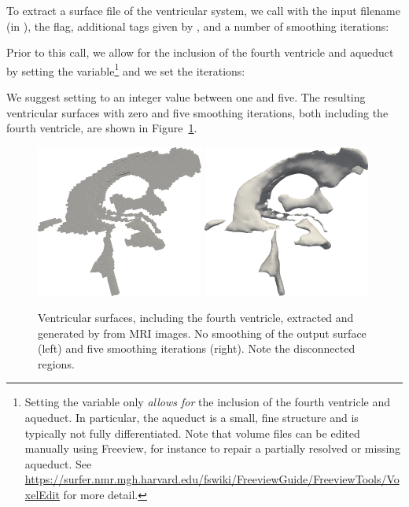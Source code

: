 \noindent To extract a surface file of the ventricular system, we call
 with the input filename (in ), the  flag, additional tags given by , and a number of smoothing iterations:


\noindent Prior to this call, we allow for the inclusion of the fourth
ventricle and aqueduct by setting the  variable\footnote{Setting 
the  variable only \textit{allows for} the inclusion of the fourth 
ventricle and aqueduct. In particular, the aqueduct is a small, fine structure 
and is typically not fully differentiated. Note 
that volume files can be edited manually using Freeview, for instance to 
repair a partially resolved or missing aqueduct. See 
\url{https://surfer.nmr.mgh.harvard.edu/fswiki/FreeviewGuide/FreeviewTools/VoxelEdit} 
for more detail.} and we set the  iterations:


\noindent We suggest setting  to an
integer value between one and five. The resulting ventricular surfaces
with zero and five smoothing iterations, both including the fourth
ventricle, are shown in
Figure~\ref{fig:chp4:ernie-ventricles-smoothing-example}.
\begin{figure}
  \includegraphics[width=0.49\textwidth]{./graphics/chp4/ernie-vent-0smooth-r.png}
  \includegraphics[width=0.49\textwidth]{./graphics/chp4/ernie-vent-5smooth-r.png}
  \caption{Ventricular surfaces, including the fourth ventricle,
    extracted and generated by \freesurfer{} from MRI images. No
    smoothing of the output surface (left) and five smoothing
    iterations (right). Note the disconnected regions.}
  \label{fig:chp4:ernie-ventricles-smoothing-example}
\end{figure}

